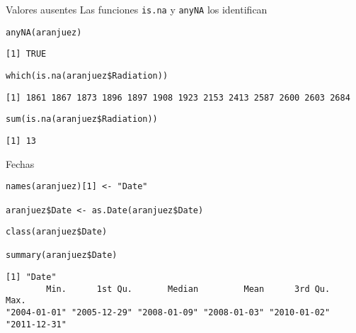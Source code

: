 \documentclass[xcolor={usenames,svgnames,dvipsnames}]{beamer}
\begin{document}
\begin{frame}[label={sec:org2f4838d},fragile]{Valores ausentes}
 Las funciones \texttt{is.na} y \texttt{anyNA} los identifican 
\lstset{language=r,label= ,caption= ,captionpos=b,numbers=none}
\begin{lstlisting}
anyNA(aranjuez)
\end{lstlisting}

\begin{verbatim}
[1] TRUE
\end{verbatim}


\lstset{language=r,label= ,caption= ,captionpos=b,numbers=none}
\begin{lstlisting}
which(is.na(aranjuez$Radiation))
\end{lstlisting}

\begin{verbatim}
[1] 1861 1867 1873 1896 1897 1908 1923 2153 2413 2587 2600 2603 2684
\end{verbatim}


\lstset{language=r,label= ,caption= ,captionpos=b,numbers=none}
\begin{lstlisting}
sum(is.na(aranjuez$Radiation))
\end{lstlisting}

\begin{verbatim}
[1] 13
\end{verbatim}
\end{frame}

\begin{frame}[label={sec:orgd93e532},fragile]{Fechas}
 \lstset{language=r,label= ,caption= ,captionpos=b,numbers=none}
\begin{lstlisting}
names(aranjuez)[1] <- "Date"

aranjuez$Date <- as.Date(aranjuez$Date)
\end{lstlisting}

\lstset{language=r,label= ,caption= ,captionpos=b,numbers=none}
\begin{lstlisting}
class(aranjuez$Date)

summary(aranjuez$Date)
\end{lstlisting}

\begin{verbatim}
[1] "Date"
        Min.      1st Qu.       Median         Mean      3rd Qu.         Max. 
"2004-01-01" "2005-12-29" "2008-01-09" "2008-01-03" "2010-01-02" "2011-12-31"
\end{verbatim}
\end{frame}
\end{document}
